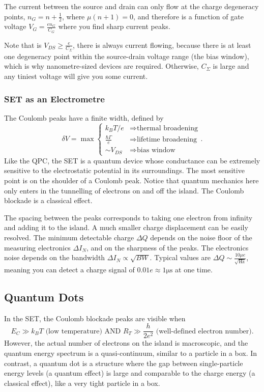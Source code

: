 \documentclass{article}
\begin{document}
The current between the source and drain can only flow at the charge degeneracy points, $n_G=n+\frac{1}{2}$, where $\mu (n+1)=0$, and therefore is a function of gate voltage $V_G=\frac{en_G}{C_G}$ where you find sharp current peaks.

Note that is $V_{DS}\geq \frac{e}{C_{\Sigma }}$, there is always current flowing, because there is at least one degeneracy point within the source-drain voltage range (the bias window), which is why nanometre-sized devices are required. Otherwise, $C_{\Sigma }$ is large and any tiniest voltage will give you some current.

\subsubsection{SET as an Electrometre}
The Coulomb peaks have a finite width, defined by 
\[
    \delta V=\max \begin{cases}
        k_B T/e & \Rightarrow \text{thermal broadening} \\
        \frac{\hbar \Gamma }{e} & \Rightarrow \text{lifetime broadening}\\
        \sim V_{DS}& \Rightarrow \text{bias window}
    \end{cases}.
\]
Like the QPC, the SET is a quantum device whose conductance can be extremely sensitive to the electrostatic potential in its surroundings. The most sensitive point is on the shoulder of a Coulomb peak. Notice that quantum mechanics here only enters in the tunnelling of electrons on and off the island. The Coulomb blockade is a classical effect.

The spacing between the peaks corresponds to taking one electron from infinity and adding it to the island. A much smaller charge displacement can be easily resolved. The minimum detectable charge $\Delta Q$ depends on the noise floor of the measuring electronics $\Delta I_N$, and on the sharpness of the peaks. The electronics noise depends on the bandwidth $\Delta I_N \propto \sqrt{BW}$. Typical values are $\Delta Q\sim \frac{10 \mu e}{\sqrt{\unit{\hertz}}}$, meaning you can detect a charge signal of $0.01e \approx 1 \unit{\micro\second}$ at one time.

\subsection{Quantum Dots}
In the SET, the Coulomb blockade peaks are visible when 
\[
    E_C \gg k_B T \text{ (low temperature) AND } R_T\gg \frac{h}{2e^2} \text{ (well-defined electron number)}.
\]
However, the actual number of electrons on the island is macroscopic, and the quantum energy spectrum is a quasi-continuum, similar to a particle in a box. In contrast, a quantum dot is a structure where the gap between single-particle energy levels (a quantum effect) is large and comparable to the charge energy (a classical effect), like a very tight particle in a box.
\end{document}
